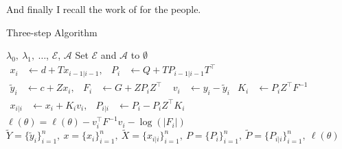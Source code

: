 \documentclass[12pt]{article}
\begin{document}
And finally I recall the work of \citep{simon2013sparse} for the people.

\begin{algorithm}
  \caption{Three-step Algorithm\label{alg:kalman}}
  \begin{algorithmic}
     $\lambda_0,\ \lambda_1,\ \dots$, $\mathcal{E}$, $\mathcal{A}$
    \STATE Set $\mathcal{E}$ and $\mathcal{A}$ to $\emptyset$ 
    \STATE $\begin{aligned} x_{i}
      &\leftarrow d + T x_{i-1|i-1}, & P_i &\leftarrow Q + T P_{i-1|i-1}
      T^\top\end{aligned}$ 
    \STATE $\begin{aligned}\widetilde{y}_i
      &\leftarrow c + Z  x_i, & F_i &\leftarrow G + Z P_i
      Z^\top\end{aligned}$ 
    \STATE $\begin{aligned}v_i&\leftarrow y_i-\widetilde{y}_i& K_i&
      \leftarrow P_i Z^\top F^{-1}\end{aligned}$ 
    \STATE $\begin{aligned} x_{i|i}
      &\leftarrow  x_i + K_i v_i, & P_{i|i} &\leftarrow P_i - P_iZ^\top
      K_i\end{aligned}$ 
    \STATE $\ell(\theta) = \ell(\theta) -v_i^\top F^{-1}v_i - \log(|F_i|)$
    \ENDFOR
    \RETURN $\widetilde{Y}=\{\widetilde{y}_i\}_{i=1}^n,\  x=\{ x_i\}_{i=1}^n,\
    \widetilde{X}=\{x_{i|i}\}_{i=1}^n,\ P=\{P_i\}_{i=1}^n,\
    \widetilde{P}=\{P_{i|i}\}_{i=1}^n,\ \ell(\theta)$
  \end{algorithmic}
\end{algorithm}



\end{document}
